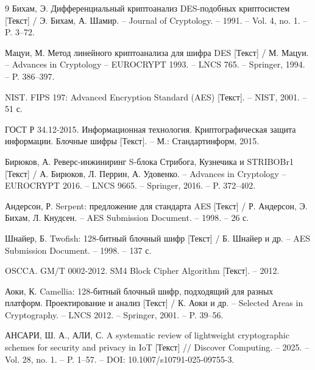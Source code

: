 \begin{thebibliography}{9}
\renewcommand{\bibnumfmt}[1]{#1.}  %
Бихам, Э. Дифференциальный криптоанализ DES-подобных криптосистем [Текст] / Э. Бихам, А. Шамир. – Journal of Cryptology. – 1991. – Vol. 4, no. 1. – P. 3–72.

Мацуи, М. Метод линейного криптоанализа для шифра DES [Текст] / М. Мацуи. – Advances in Cryptology – EUROCRYPT 1993. – LNCS 765. – Springer, 1994. – P. 386–397.

NIST. FIPS 197: Advanced Encryption Standard (AES) [Текст]. – NIST, 2001. – 51 с.

ГОСТ Р 34.12-2015. Информационная технология. Криптографическая защита информации. Блочные шифры [Текст]. – М.: Стандартинформ, 2015.

Бирюков, А. Реверс-инжиниринг S-блока Стрибога, Кузнечика и STRIBOBr1 [Текст] / А. Бирюков, Л. Перрин, А. Удовенко. – Advances in Cryptology – EUROCRYPT 2016. – LNCS 9665. – Springer, 2016. – P. 372–402.

Андерсон, Р. Serpent: предложение для стандарта AES [Текст] / Р. Андерсон, Э. Бихам, Л. Кнудсен. – AES Submission Document. – 1998. – 26 с.

Шнайер, Б. Twofish: 128-битный блочный шифр [Текст] / Б. Шнайер и др. – AES Submission Document. – 1998. – 137 с.

OSCCA. GM/T 0002-2012. SM4 Block Cipher Algorithm [Текст]. – 2012.

Аоки, К. Camellia: 128-битный блочный шифр, подходящий для разных платформ. Проектирование и анализ [Текст] / К. Аоки и др. – Selected Areas in Cryptography. – LNCS 2012. – Springer, 2001. – P. 39–56.

АНСАРИ, Ш. А., АЛИ, С. A systematic review of lightweight cryptographic schemes for security and privacy in IoT [Текст] // Discover Computing. – 2025. – Vol. 28, no. 1. – P. 1–57. – DOI: 10.1007/s10791-025-09755-3.
\end{thebibliography}





